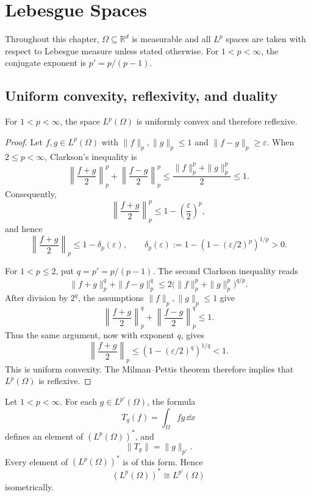 \chapter{Lebesgue Spaces}

Throughout this chapter, $\Omega\subseteq\mathbb R^d$ is measurable and all
$L^p$ spaces are taken with respect to Lebesgue measure unless stated
otherwise.  For $1<p<\infty$, the conjugate exponent is
$p'=p/(p-1)$.

\section{Uniform convexity, reflexivity, and duality}

\begin{notetheorem}
For $1<p<\infty$, the space $L^p(\Omega)$ is uniformly convex and therefore
reflexive.
\end{notetheorem}

\begin{proof}
Let $f,g\in L^p(\Omega)$ with $\|f\|_p,\|g\|_p\le1$ and
$\|f-g\|_p\ge\varepsilon$.  When $2\le p<\infty$, Clarkson's inequality is
\[
 \left\|\frac{f+g}{2}\right\|_p^p
 +\left\|\frac{f-g}{2}\right\|_p^p
 \le \frac{\|f\|_p^p+\|g\|_p^p}{2}\le1.
\]
Consequently,
\[
  \left\|\frac{f+g}{2}\right\|_p^p
  \le 1-\left(\frac{\varepsilon}{2}\right)^p,
\]
and hence
\[
  \left\|\frac{f+g}{2}\right\|_p
  \le 1-\delta_p(\varepsilon),
  \qquad
  \delta_p(\varepsilon)
  :=1-\left(1-(\varepsilon/2)^p\right)^{1/p}>0.
\]

For $1<p\le2$, put $q=p'=p/(p-1)$.  The second Clarkson inequality reads
\[
  \|f+g\|_p^q+\|f-g\|_p^q
  \le 2\bigl(\|f\|_p^p+\|g\|_p^p\bigr)^{q/p}.
\]
After division by $2^q$, the assumptions $\|f\|_p,\|g\|_p\le1$ give
\[
  \left\|\frac{f+g}{2}\right\|_p^q
  +\left\|\frac{f-g}{2}\right\|_p^q\le1.
\]
Thus the same argument, now with exponent $q$, gives
\[
  \left\|\frac{f+g}{2}\right\|_p
  \le \left(1-(\varepsilon/2)^q\right)^{1/q}<1.
\]
This is uniform convexity.  The Milman--Pettis theorem therefore implies that
$L^p(\Omega)$ is reflexive.
\end{proof}

\begin{notetheorem}
Let $1<p<\infty$.  For each $g\in L^{p'}(\Omega)$, the formula
\[
  T_g(f)=\int_\Omega f g\,\dd x
\]
defines an element of $(L^p(\Omega))^*$, and
\[
  \|T_g\|=\|g\|_{p'}.
\]
Every element of $(L^p(\Omega))^*$ is of this form.  Hence
\[
  (L^p(\Omega))^*\cong L^{p'}(\Omega)
\]
isometrically.
\end{notetheorem}

